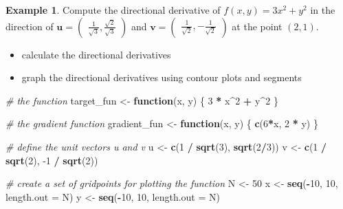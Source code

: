 \documentclass[
]{book}
\newenvironment{Shaded}{\begin{snugshade}}{\end{snugshade}}
\newcommand{\CommentTok}[1]{\textcolor[rgb]{0.56,0.35,0.01}{\textit{#1}}}
\newcommand{\ControlFlowTok}[1]{\textcolor[rgb]{0.13,0.29,0.53}{\textbf{#1}}}
\newcommand{\DataTypeTok}[1]{\textcolor[rgb]{0.13,0.29,0.53}{#1}}
\newcommand{\DecValTok}[1]{\textcolor[rgb]{0.00,0.00,0.81}{#1}}
\newcommand{\KeywordTok}[1]{\textcolor[rgb]{0.13,0.29,0.53}{\textbf{#1}}}
\newcommand{\NormalTok}[1]{#1}
\newcommand{\OperatorTok}[1]{\textcolor[rgb]{0.81,0.36,0.00}{\textbf{#1}}}
\newcommand{\StringTok}[1]{\textcolor[rgb]{0.31,0.60,0.02}{#1}}
\providecommand{\tightlist}{%
  \setlength{\itemsep}{0pt}\setlength{\parskip}{0pt}}
\theoremstyle{definition}
\theoremstyle{definition}
\newtheorem{example}{Example}[chapter]
\theoremstyle{definition}
\theoremstyle{definition}
\theoremstyle{remark}
\begin{document}
\begin{example}
Compute the directional derivative of \(f(x, y) = 3x^2 + y^2\) in the direction of \(\mathbf{u} = \begin{pmatrix} \frac{1}{\sqrt{3}}, \frac{\sqrt{2}}{\sqrt{3}} \end{pmatrix}\) and \(\mathbf{v} = \begin{pmatrix} \frac{1}{\sqrt{2}}, - \frac{1}{\sqrt{2}} \end{pmatrix}\) at the point \((2, 1)\).

\begin{itemize}
\tightlist
\item
  calculate the directional derivatives
\item
  graph the directional derivatives using contour plots and segments
\end{itemize}

\begin{Shaded}
\begin{Highlighting}[]
\CommentTok{# the function}
\NormalTok{target_fun <-}\StringTok{ }\ControlFlowTok{function}\NormalTok{(x, y) \{}
        \DecValTok{3} \OperatorTok{*}\StringTok{ }\NormalTok{x}\OperatorTok{^}\DecValTok{2} \OperatorTok{+}\StringTok{ }\NormalTok{y}\OperatorTok{^}\DecValTok{2}
\NormalTok{\}}

\CommentTok{# the gradient function}
\NormalTok{gradient_fun <-}\StringTok{ }\ControlFlowTok{function}\NormalTok{(x, y) \{}
        \KeywordTok{c}\NormalTok{(}\DecValTok{6}\OperatorTok{*}\NormalTok{x, }\DecValTok{2} \OperatorTok{*}\StringTok{ }\NormalTok{y)}
\NormalTok{\}}

\CommentTok{# define the unit vectors u and v}
\NormalTok{u <-}\StringTok{ }\KeywordTok{c}\NormalTok{(}\DecValTok{1} \OperatorTok{/}\StringTok{ }\KeywordTok{sqrt}\NormalTok{(}\DecValTok{3}\NormalTok{), }\KeywordTok{sqrt}\NormalTok{(}\DecValTok{2}\OperatorTok{/}\DecValTok{3}\NormalTok{))}
\NormalTok{v <-}\StringTok{ }\KeywordTok{c}\NormalTok{(}\DecValTok{1} \OperatorTok{/}\StringTok{ }\KeywordTok{sqrt}\NormalTok{(}\DecValTok{2}\NormalTok{), }\DecValTok{-1} \OperatorTok{/}\StringTok{ }\KeywordTok{sqrt}\NormalTok{(}\DecValTok{2}\NormalTok{))}

\CommentTok{# create a set of gridpoints for plotting the function}
\NormalTok{N <-}\StringTok{ }\DecValTok{50}
\NormalTok{x <-}\StringTok{ }\KeywordTok{seq}\NormalTok{(}\OperatorTok{-}\DecValTok{10}\NormalTok{, }\DecValTok{10}\NormalTok{, }\DataTypeTok{length.out =}\NormalTok{ N)}
\NormalTok{y <-}\StringTok{ }\KeywordTok{seq}\NormalTok{(}\OperatorTok{-}\DecValTok{10}\NormalTok{, }\DecValTok{10}\NormalTok{, }\DataTypeTok{length.out =}\NormalTok{ N)}


\end{Highlighting}
\end{Shaded}
\end{example}
\end{document}
